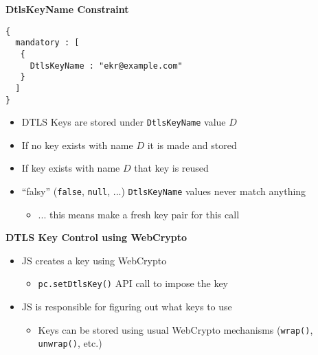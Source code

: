 \documentclass[helvetica]{seminar}
\newcommand{\heading}[1]{%
  \begin{center} 
    \large\bf 
    #1 
  \end{center} 
  \vspace{.4 in}}
\begin{document}
\begin{slide}
\heading{DtlsKeyName Constraint}

\vspace{-.25in}
\begin{verbatim}
{
  mandatory : [
   {
     DtlsKeyName : "ekr@example.com"
   }
  ] 
}
\end{verbatim}

\begin{itemize}
\item DTLS Keys are stored under \verb^DtlsKeyName^ value $D$
\item If no key exists with name $D$ it is made and stored
\item If key exists with name $D$ that key is reused
\item ``falsy'' (\verb^false^, \verb^null^, ...) \verb^DtlsKeyName^ values never match anything
  \begin{itemize}
    \item ... this means make a fresh key pair for this call
  \end{itemize}
\end{itemize}
\end{slide}


\begin{slide}
\heading{DTLS Key Control using WebCrypto}

\begin{itemize}
\item JS creates a key using WebCrypto
  \begin{itemize}
  \item \verb^pc.setDtlsKey()^ API call to impose the key
  \end{itemize}

\item JS is responsible for figuring out what keys to use
  \begin{itemize}
    \item Keys can be stored using usual WebCrypto mechanisms (\verb^wrap()^, \verb^unwrap()^, etc.)
  \end{itemize}
\end{itemize}
\end{slide}
\end{document}
